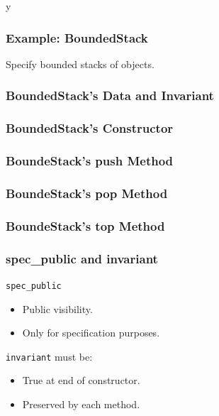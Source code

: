 \if y\MAKEHANDOUTS \documentclass[compress,landscape,handout]{beamer}
\begin{document}
\begin{frame}
\frametitle{Example: BoundedStack}

\begin{example}
Specify bounded stacks of objects.
\end{example}

\end{frame}

\begin{frame}[fragile]
\frametitle{BoundedStack's Data and Invariant}

\end{frame}

\begin{frame}[fragile]
\frametitle{BoundedStack's Constructor}

\end{frame}

\begin{frame}[fragile]
\frametitle{BoundeStack's push Method}

\end{frame}

\begin{frame}[fragile]
\frametitle{BoundeStack's pop Method}

\end{frame}

\begin{frame}[fragile]
\frametitle{BoundeStack's top Method}

\end{frame}

\begin{frame}[fragile]
\frametitle{spec\_public and invariant}

\lstinline!spec_public!
\begin{itemize}
\item
Public visibility.

\item
Only for specification purposes.
\end{itemize}


\lstinline!invariant! must be:
\begin{itemize}
\item
True at end of constructor.

\item
Preserved by each method.
\end{itemize}

\end{frame}
\end{document}
